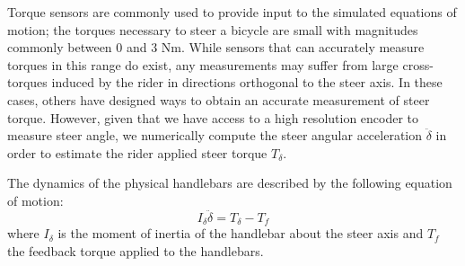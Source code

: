 \documentclass[11pt,a4paper,reqno]{amsart}
\begin{document}
Torque sensors are commonly used to provide input to the simulated equations of motion\cite{FIXME}; the torques
necessary to steer a bicycle are small with magnitudes commonly between 0 and 3 Nm\cite{moore2012}.
While sensors that can accurately measure torques in this range do exist, any measurements may suffer from large
cross-torques induced by the rider in directions orthogonal to the steer axis.
In these cases, others have designed ways to obtain an accurate measurement of steer torque\cite{moore2012}.
However, given that we have access to a high resolution encoder to measure steer angle, we numerically compute the steer
angular acceleration $ \ddot{\delta} $ in order to estimate the rider applied steer torque $ T_\delta $.

The dynamics of the physical handlebars are described by the following equation of motion:
\begin{equation}
    I_\delta \ddot{\delta} = T_\delta - T_f
\end{equation}
where $ I_\delta $ is the moment of inertia of the handlebar about the steer axis and $ T_f $ the feedback torque
applied to the handlebars.
\end{document}
